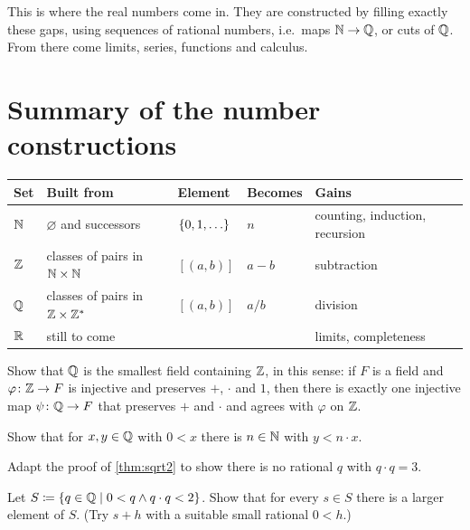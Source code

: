 This is where the real numbers come in. They are constructed by filling exactly
these gaps, using sequences of rational numbers, i.e.\ maps $\mathbb{N} \to \mathbb{Q}$, or cuts
of $\mathbb{Q}$. From there come limits, series, functions and calculus.

\section{Summary of the number constructions}

\begin{center}
\begin{tabular}{@{}lllll@{}}
  \toprule
  Set & Built from & Element & Becomes & Gains \\
  \midrule
  $\mathbb{N}$ & $\varnothing$ and successors & $\set{0, 1, \dots}$ & $n$ & counting,
    induction, recursion \\
  $\mathbb{Z}$ & classes of pairs in $\mathbb{N} \times \mathbb{N}$ & $[(a, b)]$ & $a - b$ & subtraction \\
  $\mathbb{Q}$ & classes of pairs in $\mathbb{Z} \times \mathbb{Z}^\ast$ & $[(a, b)]$ & $a / b$ & division \\
  $\mathbb{R}$ & still to come & & & limits, completeness \\
  \bottomrule
\end{tabular}
\end{center}

\begin{exercises}
  \item Show that $\mathbb{Q}$ is the smallest field containing $\mathbb{Z}$, in this sense: if $F$
    is a field and $\varphi \colon \mathbb{Z} \to F$ is injective and preserves $+$, $\cdot$
    and $1$, then there is exactly one injective map $\psi \colon \mathbb{Q} \to F$ that
    preserves $+$ and $\cdot$ and agrees with $\varphi$ on $\mathbb{Z}$.
  \item Show that for $x, y \in \mathbb{Q}$ with $0 < x$ there is $n \in \mathbb{N}$ with $y < n
    \cdot x$.
  \item Adapt the proof of \cref{thm:sqrt2} to show there is no rational $q$ with
    $q \cdot q = 3$.
  \item Let $S \coloneqq \lbrace q \in \mathbb{Q} \mid 0 < q \land q \cdot q < 2 \rbrace$. Show that for
    every $s \in S$ there is a larger element of $S$. (Try $s + h$ with a suitable
    small rational $0 < h$.)
\end{exercises}
